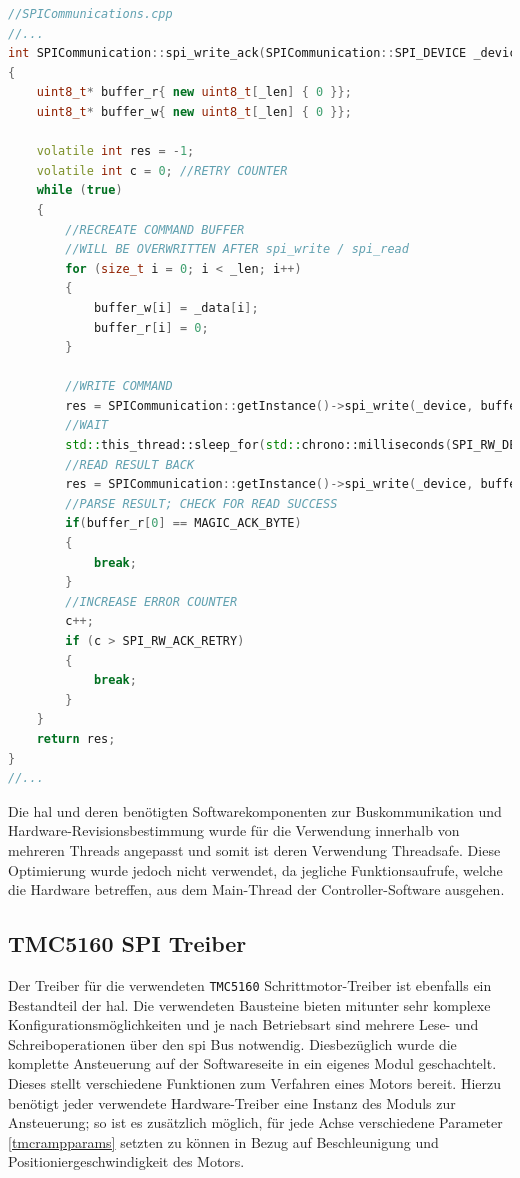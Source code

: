 \begin{lstlisting}[language={C++}]
//SPICommunications.cpp
//...
int SPICommunication::spi_write_ack(SPICommunication::SPI_DEVICE _device, uint8_t* _data, int _len)
{
    uint8_t* buffer_r{ new uint8_t[_len] { 0 }};
    uint8_t* buffer_w{ new uint8_t[_len] { 0 }};

    volatile int res = -1;
    volatile int c = 0; //RETRY COUNTER
    while (true)
    {
        //RECREATE COMMAND BUFFER
        //WILL BE OVERWRITTEN AFTER spi_write / spi_read
        for (size_t i = 0; i < _len; i++)
        {
            buffer_w[i] = _data[i];
            buffer_r[i] = 0;
        }
        
        //WRITE COMMAND
        res = SPICommunication::getInstance()->spi_write(_device, buffer_w, _len);
        //WAIT
        std::this_thread::sleep_for(std::chrono::milliseconds(SPI_RW_DELAY));
        //READ RESULT BACK
        res = SPICommunication::getInstance()->spi_write(_device, buffer_r, _len);
        //PARSE RESULT; CHECK FOR READ SUCCESS
        if(buffer_r[0] == MAGIC_ACK_BYTE)
        {
            break;
        }
        //INCREASE ERROR COUNTER
        c++;
        if (c > SPI_RW_ACK_RETRY)
        {
            break;
        }
    }
    return res;
}
//...
\end{lstlisting}

Die \gls{hal} und deren benötigten Softwarekomponenten zur
Buskommunikation und Hardware-Revisionsbestimmung wurde für die
Verwendung innerhalb von mehreren Threads angepasst und somit ist deren
Verwendung Threadsafe. Diese Optimierung wurde jedoch nicht verwendet,
da jegliche Funktionsaufrufe, welche die Hardware betreffen, aus dem
Main-Thread der Controller-Software ausgehen.

\hypertarget{tmc5160-spi-treiber}{%
\subsection{TMC5160 SPI Treiber}\label{tmc5160-spi-treiber}}

Der Treiber für die verwendeten \passthrough{\lstinline!TMC5160!}
Schrittmotor-Treiber ist ebenfalls ein Bestandteil der \gls{hal}. Die
verwendeten Bausteine bieten mitunter sehr komplexe
Konfigurationsmöglichkeiten und je nach Betriebsart sind mehrere Lese-
und Schreiboperationen über den \gls{spi} Bus notwendig. Diesbezüglich
wurde die komplette Ansteuerung auf der Softwareseite in ein eigenes
Modul geschachtelt. Dieses stellt verschiedene Funktionen zum Verfahren
eines Motors bereit. Hierzu benötigt jeder verwendete Hardware-Treiber
eine Instanz des Moduls zur Ansteuerung; so ist es zusätzlich möglich,
für jede Achse verschiedene Parameter \ref{tmcrampparams} setzten zu
können in Bezug auf Beschleunigung und Positioniergeschwindigkeit des
Motors.

